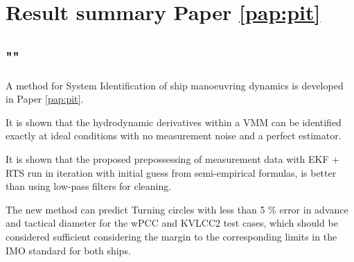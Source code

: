 \section{Result summary Paper \ref{pap:pit}}
\subsection*{""}
A method for System Identification of ship manoeuvring dynamics is developed in Paper \ref{pap:pit}. 

It is shown that the hydrodynamic derivatives within a VMM can be identified exactly at ideal conditions with no measurement noise and a perfect estimator.

It is shown that the proposed prepossessing of measurement data with EKF + RTS run in iteration with initial guess from semi-empirical formulas, is better than using low-pass filters for cleaning.

The new method can predict Turning circles with less than 5 \% error in advance and tactical diameter for the wPCC and KVLCC2 test cases, which should be considered sufficient considering the margin to the corresponding limits in the IMO standard for both ships.